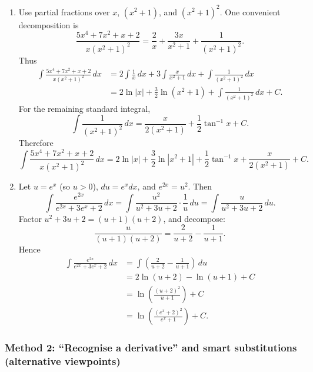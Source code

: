 \documentclass[12pt]{article}
\begin{document}
\begin{enumerate}[label=(\alph*)]
\item Use partial fractions over \(x\), \((x^{2}+1)\), and \((x^{2}+1)^{2}\). One convenient decomposition is
\[
\frac{5x^{4}+7x^{2}+x+2}{x(x^{2}+1)^{2}}
=\frac{2}{x}+\frac{3x}{x^{2}+1}+\frac{1}{(x^{2}+1)^{2}}.
\]
Thus
\begin{align*}
\int \frac{5x^{4}+7x^{2}+x+2}{x(x^{2}+1)^{2}}\,dx
&=2\int \frac{1}{x}\,dx + 3\int \frac{x}{x^{2}+1}\,dx + \int \frac{1}{(x^{2}+1)^{2}}\,dx\\
&=2\ln|x|+\frac{3}{2}\ln(x^{2}+1)+\int \frac{1}{(x^{2}+1)^{2}}\,dx + C.
\end{align*}
For the remaining standard integral,
\[
\int \frac{1}{(x^{2}+1)^{2}}\,dx = \frac{x}{2(x^{2}+1)}+\frac{1}{2}\tan^{-1}x + C.
\]
Therefore
\[
\boxed{\int \frac{5x^{4}+7x^{2}+x+2}{x(x^{2}+1)^{2}}\,dx
=2\ln|x|+\frac{3}{2}\ln|x^{2}+1|+\frac{1}{2}\tan^{-1}x+\frac{x}{2(x^{2}+1)}+C.}
\]

\item Let \(u=e^{x}\) (so \(u>0\)), \(du=e^{x}dx\), and \(e^{2x}=u^{2}\). Then
\[
\int \frac{e^{2x}}{e^{2x}+3e^{x}+2}\,dx
=\int \frac{u^{2}}{u^{2}+3u+2}\cdot \frac{1}{u}\,du
=\int \frac{u}{u^{2}+3u+2}\,du.
\]
Factor \(u^{2}+3u+2=(u+1)(u+2)\), and decompose:
\[
\frac{u}{(u+1)(u+2)}=\frac{2}{u+2}-\frac{1}{u+1}.
\]
Hence
\begin{align*}
\int \frac{e^{2x}}{e^{2x}+3e^{x}+2}\,dx
&=\int \left(\frac{2}{u+2}-\frac{1}{u+1}\right)\,du\\
&=2\ln(u+2)-\ln(u+1)+C\\
&=\ln\left(\frac{(u+2)^{2}}{u+1}\right)+C\\
&=\boxed{\ln\left(\frac{(e^{x}+2)^{2}}{e^{x}+1}\right)+C.}
\end{align*}
\end{enumerate}

\subsubsection*{Method 2: ``Recognise a derivative'' and smart substitutions (alternative viewpoints)}
\end{document}
